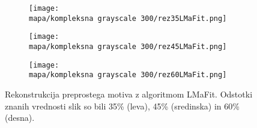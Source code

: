 \begin{figure}[!ht]
    \begin{subfigure}{0.325\linewidth}
        \texttt{[image: \\mapa/kompleksna grayscale 300/rez35LMaFit.png]}
    \end{subfigure}
    \hfill
    \begin{subfigure}{0.325\linewidth}
        \texttt{[image: \\mapa/kompleksna grayscale 300/rez45LMaFit.png]}
    \end{subfigure}
    \hfill
    \begin{subfigure}{0.325\linewidth}
        \texttt{[image: \\mapa/kompleksna grayscale 300/rez60LMaFit.png]}
    \end{subfigure}
    \caption{Rekonstrukcija preprostega motiva z algoritmom LMaFit. Odstotki znanih vrednosti slik so bili 35\% (leva), 45\% (sredinska) in 60\% (desna).}
\end{figure}